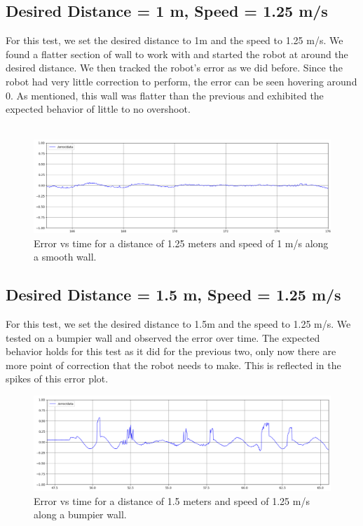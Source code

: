 \documentclass{article}
\begin{document}
\subsection{Desired Distance = 1 m, Speed = 1.25 m/s}
For this test, we set the desired distance to 1m and the speed to 1.25 m/s. We found a flatter section of wall to work with and started the robot at around the desired distance. We then tracked the robot's error as we did before. Since the robot had very little correction to perform, the error can be seen hovering around 0. As mentioned, this wall was flatter than the previous and exhibited the expected behavior of little to no overshoot.
\\\\
\begin{figure}[!h]
\begin{center}
\includegraphics[width=\textwidth]{error_speed_1_dist_125.png}
\caption{Error vs time for a distance of 1.25 meters and speed of 1 m/s along a smooth wall.}
\end{center}
\end{figure}

\subsection{Desired Distance = 1.5 m, Speed = 1.25 m/s}
For this test, we set the desired distance to 1.5m and the speed to 1.25 m/s. We tested on a bumpier wall and observed the error over time. The expected behavior holds for this test as it did for the previous two, only now there are more point of correction that the robot needs to make. This is reflected in the spikes of this error plot.
\begin{figure}[!h]
\begin{center}
\includegraphics[width=\textwidth]{error_speed_15_dist_125.png}
\caption{Error vs time for a distance of 1.5 meters and speed of 1.25 m/s along a bumpier wall.}
\end{center}
\end{figure}
\end{document}
